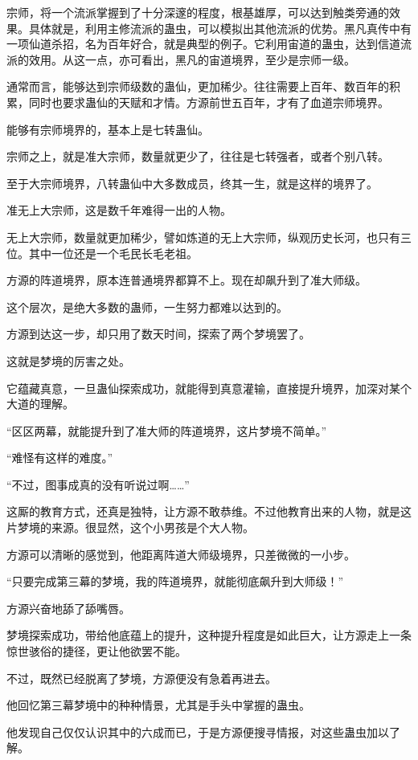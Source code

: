 \begin{this_body}
宗师，将一个流派掌握到了十分深邃的程度，根基雄厚，可以达到触类旁通的效果。具体就是，利用主修流派的蛊虫，可以模拟出其他流派的优势。黑凡真传中有一项仙道杀招，名为百年好合，就是典型的例子。它利用宙道的蛊虫，达到信道流派的效用。从这一点，亦可看出，黑凡的宙道境界，至少是宗师一级。

通常而言，能够达到宗师级数的蛊仙，更加稀少。往往需要上百年、数百年的积累，同时也要求蛊仙的天赋和才情。方源前世五百年，才有了血道宗师境界。

能够有宗师境界的，基本上是七转蛊仙。

宗师之上，就是准大宗师，数量就更少了，往往是七转强者，或者个别八转。

至于大宗师境界，八转蛊仙中大多数成员，终其一生，就是这样的境界了。

准无上大宗师，这是数千年难得一出的人物。

无上大宗师，数量就更加稀少，譬如炼道的无上大宗师，纵观历史长河，也只有三位。其中一位还是一个毛民长毛老祖。

方源的阵道境界，原本连普通境界都算不上。现在却飙升到了准大师级。

这个层次，是绝大多数的蛊师，一生努力都难以达到的。

方源到达这一步，却只用了数天时间，探索了两个梦境罢了。

这就是梦境的厉害之处。

它蕴藏真意，一旦蛊仙探索成功，就能得到真意灌输，直接提升境界，加深对某个大道的理解。

“区区两幕，就能提升到了准大师的阵道境界，这片梦境不简单。”

“难怪有这样的难度。”

“不过，图事成真的没有听说过啊……”

这厮的教育方式，还真是独特，让方源不敢恭维。不过他教育出来的人物，就是这片梦境的来源。很显然，这个小男孩是个大人物。

方源可以清晰的感觉到，他距离阵道大师级境界，只差微微的一小步。

“只要完成第三幕的梦境，我的阵道境界，就能彻底飙升到大师级！”

方源兴奋地舔了舔嘴唇。

梦境探索成功，带给他底蕴上的提升，这种提升程度是如此巨大，让方源走上一条惊世骇俗的捷径，更让他欲罢不能。

不过，既然已经脱离了梦境，方源便没有急着再进去。

他回忆第三幕梦境中的种种情景，尤其是手头中掌握的蛊虫。

他发现自己仅仅认识其中的六成而已，于是方源便搜寻情报，对这些蛊虫加以了解。


\end{this_body}
